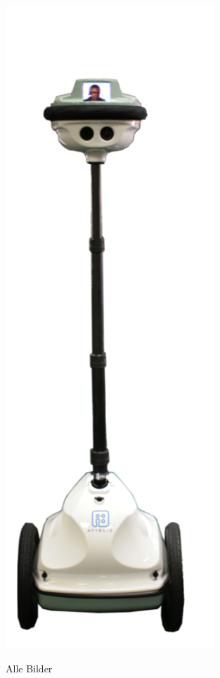 \begin{figure}[ht]
\begin{minipage}[b]{.25\linewidth}
      \label{fig:y} 
   \end{minipage}%
   \hfill
   \begin{minipage}[b]{.25\linewidth} 
      \centering 
      \includegraphics[width=0.7\textwidth]{bilder/grundlagen/4.png} 
      \label{fig:z} 
   \end{minipage}%
   \hfill
   \caption{Alle Bilder}\label{fig:Bilder} 
\end{figure} 


